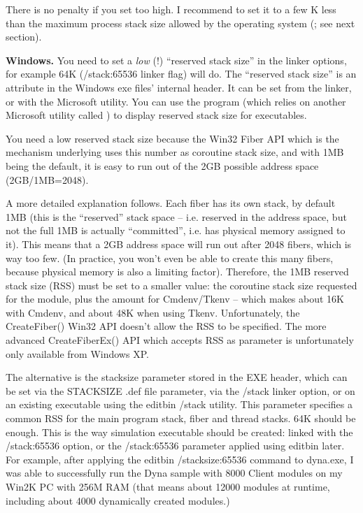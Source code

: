 There is no penalty if you set  too high. I
recommend to set it to a few K less than the maximum process stack
size allowed by the operating system (; see
next section).


\textbf{Windows.}
You need to set a \textit{low} (!) ``reserved stack size''
in the linker options, for example 64K (/stack:65536 linker flag) will do.
The ``reserved stack size'' is an attribute in the Windows exe
files' internal header. It can be set from the linker, or with
the  Microsoft utility. You can use the 
program (which relies on another Microsoft utility called )
to display reserved stack size for executables.

You need a low reserved stack size because the Win32 Fiber API
which is the mechanism underlying  uses
this number as coroutine stack size, and with 1MB being the default,
it is easy to run out of the 2GB possible address space (2GB/1MB=2048).

A more detailed explanation follows.
Each fiber has its own stack, by default 1MB (this is the ``reserved''
stack space -- i.e. reserved in the address space, but not the full
1MB is actually ``committed'', i.e. has physical memory assigned to it).
This means that a 2GB address space will run out after 2048 fibers,
which is way too few. (In practice, you won't even be able to create
this many fibers, because physical memory is also a limiting factor).
Therefore, the 1MB reserved stack size (RSS) must be set to a smaller
value: the coroutine stack size requested for the module, plus
the  amount for Cmdenv/Tkenv -- which makes
about 16K with Cmdenv, and about 48K when using Tkenv.
Unfortunately, the CreateFiber() Win32 API doesn't allow the RSS to be
specified. The more advanced CreateFiberEx() API which accepts RSS as
parameter is unfortunately only available from Windows XP.

The alternative is the stacksize parameter stored in the EXE header,
which can be set
via the STACKSIZE .def file parameter, via the /stack linker option,
or on an existing executable using the editbin /stack utility.
This parameter specifies a common RSS for the main program stack,
fiber and thread stacks. 64K should be enough. This is the way
simulation executable should be created: linked with the /stack:65536
option, or the /stack:65536 parameter applied using editbin later.
For example, after applying the editbin /stacksize:65536 command to
dyna.exe, I was able to successfully run the Dyna sample with 8000
Client modules on my Win2K PC with 256M RAM (that means about 12000
modules at runtime, including about 4000 dynamically created modules.)


